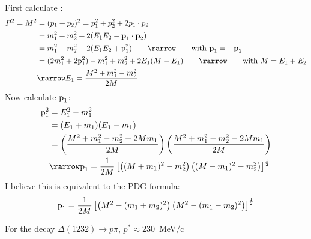 \begin{enumerate}
          \begin{solution}
              First calculate \eb:
              \begin{align*}
                  P^2 = \ma^2 & = (\pb + \pc)^2 = \pb^2 + \pc^2 + 2\pb\cdot \pc                                                              \\
                              & = \mb^2 + \mc^2 + 2(\eb \ec - \pvecb\cdot \pvecc)                                                            \\
                              & = \mb^2 + \mc^2 + 2(\eb \ec + \pmodvecb^2) \qquad \rarrow \qquad \text{with }\pvecb = -\pvecc                \\
                              & = (2\mb^2 + 2\pmodvecb^2) - \mb^2 + \mc^2 + 2\eb(\ma-\eb) \qquad \rarrow \qquad \text{with } \ma = \eb + \ec \\
                              & \rarrow \eb = \frac{\ma^2 + \mb^2 - \mc^2}{2\ma}
              \end{align*}
              Now calculate $\text{p}_1$:
              \begin{align*}
                  \pmodvecb^2 & = \eb^2 - \mb^2                                                                                                      \\
                              & = (\eb + \mb)(\eb - \mb)                                                                                             \\
                              & = \left(\frac{\ma^2 + \mb^2 - \mc^2 + 2\ma\mb}{2\ma}\right)\left(\frac{\ma^2 + \mb^2 - \mc^2 - 2\ma\mb}{2\ma}\right) \\
                              & \rarrow \pmodvecb = \frac{1}{2\ma}
                  \left[ \left( (\ma+\mb)^2 - \mc^2 \right)
                      \left( (\ma-\mb)^2 - \mc^2 \right)  \right ]^{\frac{1}{2}}
              \end{align*}
              I believe this is equivalent to the PDG formula:
              \begin{align*}
                  \text{p}_1 = \frac{1}{2M}
                  \left[ \left( M^2 - (m_1+m_2)^2 \right)
                      \left( M^2 - (m_1-m_2)^2 \right)  \right ]^{\frac{1}{2}}
              \end{align*}

              For the decay $\Delta(1232)\to p\pi$, $p^* \approx 230$~MeV/c

          \end{solution}



\end{enumerate}
